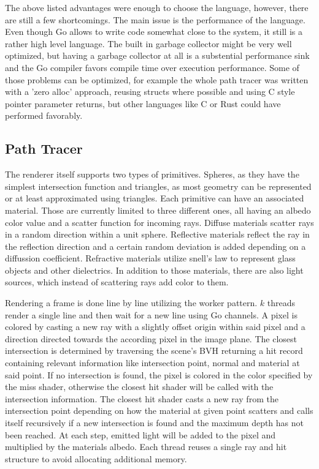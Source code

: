The above listed advantages were enough to choose the language, however, there are still a few shortcomings. The main issue is the performance of the language. Even though Go allows to write code somewhat close to the system, it still is a rather high level language. The built in garbage collector might be very well optimized, but having a garbage collector at all is a substential performance sink and the Go compiler favors compile time over execution performance. Some of those problems can be optimized, for example the whole path tracer was written with a 'zero alloc' approach, reusing structs where possible and using C style pointer parameter returns, but other languages like C or Rust could have performed favorably.

\subsection{Path Tracer}
The renderer itself supports two types of primitives. Spheres, as they have the simplest intersection function and triangles, 
as most geometry can be represented or at least approximated using triangles. Each primitive can have an associated material. Those are currently limited to three different ones, all having an albedo color value and a scatter function for incoming rays. Diffuse materials scatter rays in a random direction within a unit sphere. Reflective materials reflect the ray in the reflection direction and a certain random deviation is added depending on a diffussion coefficient. Refractive materials utilize snell's law to represent glass objects and other dielectrics. In addition to those materials, there are also light sources, which instead of scattering rays add color to them. 

Rendering a frame is done line by line utilizing the worker pattern. $k$ threads render a single line and then wait for a new 
line using Go channels. A pixel is colored by casting a new ray with a slightly offset origin within said pixel and a direction directed towards the according pixel in the image plane. The closest intersection is determined by traversing the 
scene's BVH returning a hit record containing relevant information like intersection point, normal and material at said point. If no intersection is found, the pixel is colored in the color specified by the miss shader, otherwise the closest hit shader will be called with the intersection information. The closest hit shader casts a new ray from the intersection point depending on how the material at given point scatters and calls itself recursively if a new intersection is found and the maximum depth has not been reached. At each step, emitted light will be added to the pixel and multiplied by the materials albedo. Each thread reuses a single ray and hit structure to avoid allocating additional memory.
